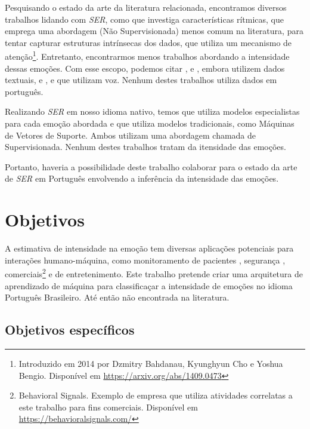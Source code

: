 Pesquisando o estado da arte da literatura relacionada, encontramos diversos trabalhos lidando com \textit{SER}, como \cite{11} que investiga características rítmicas, \cite{34} que emprega uma abordagem (Não Supervisionada) menos comum na literatura, para tentar capturar estruturas intrínsecas dos dados, \cite{32.95} que utiliza um mecanismo de atenção\footnote{Introduzido em 2014 por Dzmitry Bahdanau, Kyunghyun Cho e Yoshua Bengio. Disponível em \url{https://arxiv.org/abs/1409.0473}}. Entretanto, encontrarmos menos trabalhos abordando a intensidade dessas emoções. Com esse escopo, podemos citar \cite{14}, \cite{15} e \cite{28}, embora utilizem dados textuais, e \cite{3}, \cite{18} e \cite{20} que utilizam voz. Nenhum destes trabalhos utiliza dados em português.

Realizando \textit{SER} em nosso idioma nativo, temos \cite{12} que utiliza modelos especialistas para cada emoção abordada e \cite{21} que utiliza modelos tradicionais, como Máquinas de Vetores de Suporte. Ambos utilizam uma abordagem chamada de Supervisionada. Nenhum destes trabalhos tratam da itensidade das emoções.

Portanto, haveria a possibilidade deste trabalho colaborar para o estado da arte de \textit{SER} em Português envolvendo a inferência da intensidade das emoções.

\section{Objetivos}

A estimativa de intensidade na emoção tem diversas aplicações potenciais para interações humano-máquina, como monitoramento de pacientes \cite{1}, segurança \cite{4}, comerciais\footnote{Behavioral Signals. Exemplo de empresa que utiliza atividades correlatas a este trabalho para fins comerciais. Disponível em \url{https://behavioralsignals.com/}} e de entretenimento. Este trabalho pretende criar uma arquitetura de aprendizado de máquina para classificaçar a intensidade de emoções no idioma Português Brasileiro. Até então não encontrada na literatura.

\subsection{Objetivos específicos}


